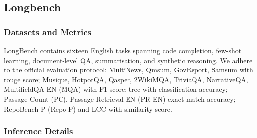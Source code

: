 

\subsection{Longbench}
\label{sec:longbench}

\subsubsection{Datasets and Metrics}
LongBench contains sixteen English tasks spanning code completion, few-shot learning, document-level QA, summarisation, and synthetic reasoning. We adhere to the official evaluation protocol: MultiNews, Qmsum, GovReport, Samsum with rouge score; Musique, HotpotQA, Qasper, 2WikiMQA, TriviaQA, NarrativeQA, MultifieldQA-EN (MQA) with F1 score; trec with classification accuracy; Passage-Count (PC), Passage-Retrieval-EN (PR-EN) exact-match accuracy; RepoBench-P (Repo-P) and LCC with similarity score.




\subsubsection{Inference Details}

